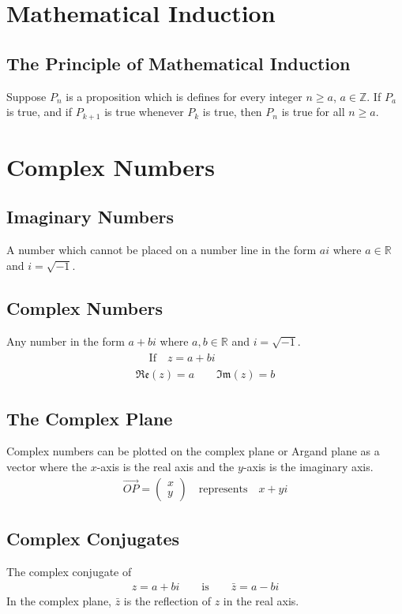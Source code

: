 \documentclass[10pt, a4paper, titlepage]{article}
\begin{document}
\begin{multicols*}{3}
\section{Mathematical Induction}
\subsection{The Principle of Mathematical Induction}
Suppose $P_n$ is a proposition which is defines for every integer $n\geq a$, $a\in \mathbb{Z}$. If $P_a$ is true, and if $P_{k+1}$ is true whenever $P_k$ is true, then $P_n$ is true for all $n\geq a$.

\hrulefill
\section{Complex Numbers}
\subsection{Imaginary Numbers}
A number which cannot be placed on a number line in the form $ai$ where $a\in \mathbb{R}$ and $i=\sqrt{-1}$.\\

\dotfill
\subsection{Complex Numbers}
Any number in the form $a+bi$ where $a,b\in \mathbb{R}$ and $i=\sqrt{-1}$.
\begin{gather}
	\begin{flalign}
		&\text{If}\quad z=a+bi&&
	\end{flalign}\\
	\mathfrak{Re} (z)=a\qquad \mathfrak{Im} (z)=b
\end{gather}
\dotfill
\subsection{The Complex Plane}
Complex numbers can be plotted on the complex plane or Argand plane as a vector where the $x$-axis is the real axis and the $y$-axis is the imaginary axis.
\begin{align}
	\overrightarrow{OP}=\begin{pmatrix}x\\ y\end{pmatrix}\quad \text{represents}\quad x+yi
\end{align}
\dotfill
\subsection{Complex Conjugates}
The complex conjugate of
\begin{align}
	z=a+bi\qquad \text{is}\qquad \bar{z}=a-bi
\end{align}
In the complex plane, $\bar{z}$ is the  reflection of $z$ in the real axis.


\end{multicols*}
\end{document}

